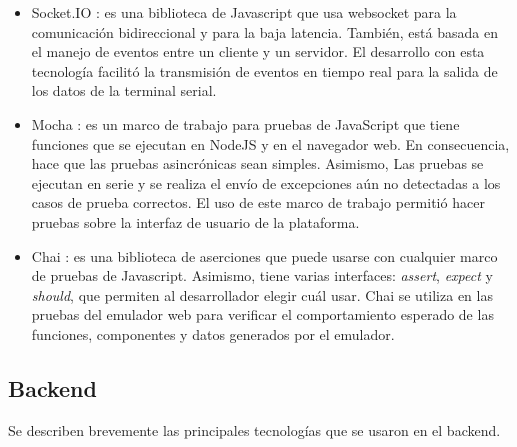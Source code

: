 \begin{itemize}
    \item Socket.IO \citep{Socket}: es una biblioteca de Javascript que usa websocket para la comunicación bidireccional y para la baja latencia. También, está basada en el manejo de eventos entre un cliente y un servidor. El desarrollo con esta tecnología facilitó la transmisión de eventos en tiempo real para la salida de los datos de la terminal serial.
    
    
     \item Mocha \citep{Mocha}: es un marco de trabajo para pruebas de JavaScript que tiene funciones que se ejecutan en NodeJS y en el navegador web. En consecuencia, hace que las pruebas asincrónicas sean simples. Asimismo, Las pruebas se ejecutan en serie y se realiza el envío de excepciones aún no detectadas a los casos de prueba correctos.
El uso de este marco de trabajo permitió hacer pruebas sobre la interfaz de usuario de la plataforma.
     
     \item Chai \citep{Chai}: es una biblioteca de aserciones que puede usarse con cualquier marco de pruebas de Javascript. Asimismo, tiene varias interfaces: \textit{assert}, \textit{expect} y \textit{should}, que permiten al desarrollador elegir cuál usar. Chai se utiliza en las pruebas del emulador web para  verificar el comportamiento esperado de las funciones, componentes y datos generados por el emulador. 
     
   
\end{itemize}


\subsection{Backend}

Se describen brevemente las principales tecnologías que se usaron en el backend.

